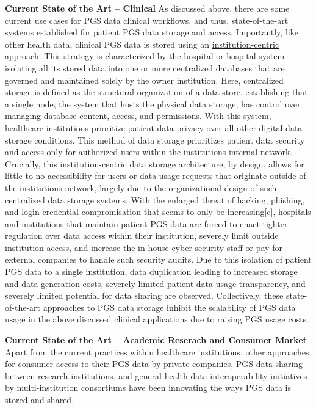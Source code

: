 \documentclass[11pt]{article}
\begin{document}
\textbf{Current State of the Art -- Clinical}
As discussed above, there are some current use cases for PGS data clinical workflows, and thus, state-of-the-art systems established for  patient PGS data storage and access. 
Importantly, like other health data, clinical PGS data is stored using an \underline{institution-centric approach}. 
This strategy is characterized by the hospital or hospital system isolating all its stored data into one or more centralized databases that are governed and maintained solely by the owner institution. 
Here, centralized storage is defined as the structural organization of a data store, establishing that a single node, the system that hosts the physical data storage, has control over managing database content, access, and permissions. 
With this system, healthcare institutions prioritize patient data privacy over all other digital data storage conditions. 
This method of data storage prioritizes patient data security and access only for authorized users within the institution\textquotesingle s internal network. 
Crucially, this institution-centric data storage architecture, by design, allows for little to no accessibility for users or data usage requests that originate outside of the institution\textquotesingle s network, largely due to the organizational design of such centralized data storage systems. 
With the enlarged threat of hacking, phishing, and login credential compromisation that seems to only be increasing[c], hospitals and institutions that maintain patient PGS data are forced to enact tighter regulation over data access within their institution, severely limit outside institution access, and increase the in-house cyber security staff or pay for external companies to handle such security audits.  
Due to this isolation of patient PGS data to a single institution, data duplication leading to increased storage and data generation costs, severely limited patient data usage transparency, and severely limited potential for data sharing are observed. 
Collectively, these state-of-the-art approaches to PGS data storage inhibit the scalability of PGS data usage in the above discussed clinical applications due to raising PGS usage costs.

\textbf{Current State of the Art -- Academic Reserach and Consumer Market}
Apart from the current practices within healthcare institutions, other approaches for consumer access to their PGS data by private companies, PGS data sharing between research institutions, and general health data interoperability initiatives by multi-institution consortiums have been innovating the ways PGS data is stored and shared. 
\end{document}
